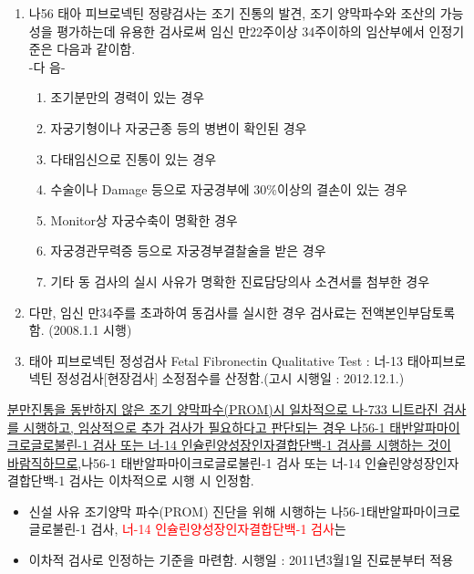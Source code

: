 \prezi{\clearpage}
\begin{enumerate}[1.]\tightlist
\item 나56 태아 피브로넥틴 정량검사는 조기 진통의 발견, 조기 양막파수와 조산의 가능성을 평가하는데 유용한 검사로써 임신 만22주이상 34주이하의 임산부에서 인정기준은 다음과 같이함.\\
-다 음-
	\begin{enumerate}[가.]\tightlist
	\item 조기분만의 경력이 있는 경우
	\item 자궁기형이나 자궁근종 등의 병변이 확인된 경우
	\item 다태임신으로 진통이 있는 경우
	\item 수술이나 Damage 등으로 자궁경부에 30\%이상의 결손이 있는 경우
	\item Monitor상 자궁수축이 명확한 경우
	\item 자궁경관무력증 등으로 자궁경부결찰술을 받은 경우
	\item 기타 동 검사의 실시 사유가 명확한 진료담당의사 소견서를 첨부한 경우
	\end{enumerate}
\item 다만, 임신 만34주를 초과하여 동검사를 실시한 경우 검사료는 전액본인부담토록 함. (2008.1.1 시행)
\item 태아 피브로넥틴 정성검사 Fetal Fibronectin Qualitative Test : 너-13 태아피브로넥틴 정성검사[현장검사] 소정점수를 산정함.(고시 시행일 : 2012.12.1.)
\end{enumerate}
\par
\medskip

\prezi{\clearpage}
\par
\uline{분만진통을 동반하지 않은 조기 양막파수(PROM)시 일차적으로 나-733 니트라진 검사를 시행하고, 임상적으로 추가 검사가 필요하다고 판단되는 경우 나56-1 태반알파마이크로글로불린-1 검사 또는 너-14 인슐린양성장인자결합단백-1 검사를 시행하는 것이 바람직하므로},나56-1 태반알파마이크로글로불린-1 검사 또는 너-14 인슐린양성장인자결합단백-1 검사는 이차적으로 시행 시 인정함.
\begin{itemize}[☞]\tightlist
\item 신설 사유 조기양막 파수(PROM) 진단을 위해 시행하는 나56-1태반알파마이크로글로불린-1 검사, \textcolor{red}{너-14 인슐린양성장인자결합단백-1 검사}는
\item 이차적 검사로 인정하는 기준을 마련함. 시행일 : 2011년3월1일 진료분부터 적용
\end{itemize}

